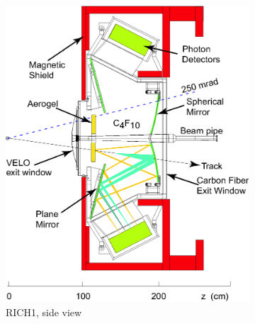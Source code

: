 \begin{figure}[htbp]
	\begin{center}
		\begin{subfigure}[b]{0.49\textwidth}
			\includegraphics[width=\textwidth]{Chapters/detector/rich/rich1_schematic.png}
			\caption{RICH1, side view}
			\label{fig: rich1_schematic}
		\end{subfigure}
		\begin{subfigure}[b]{0.49\textwidth}

\end{subfigure}
\end{center}
\end{figure}
